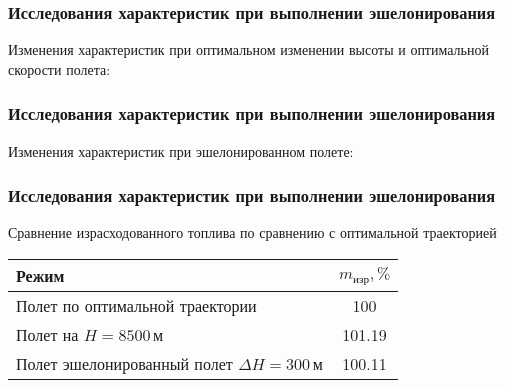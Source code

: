\documentclass{beamer}
\begin{document}
\begin{frame}[t]
    \frametitle{Исследования характеристик при выполнении эшелонирования}
    \begin{center}
        Изменения характеристик при оптимальном изменении высоты и оптимальной
        скорости полета:

        \begin{minipage}{0.49\textwidth}
            \centering
            \resizebox{1.0\textwidth}{!}{}
        \end{minipage}
        \hfill
        \begin{minipage}{0.49\textwidth}
            \centering
            \resizebox{1.0\textwidth}{!}{}
        \end{minipage}
    \end{center}
\end{frame}

\begin{frame}[t]
    \frametitle{Исследования характеристик при выполнении эшелонирования}
    \begin{center}
        Изменения характеристик при эшелонированном полете: 

        \begin{minipage}{0.49\textwidth}
            \centering
            \resizebox{1.0\textwidth}{!}{}
        \end{minipage}
        \hfill
        \begin{minipage}{0.49\textwidth}
            \centering
            \resizebox{1.0\textwidth}{!}{
            }
        \end{minipage}
    \end{center}
\end{frame}


\begin{frame}[t]
    \frametitle{Исследования характеристик при выполнении эшелонирования}
    \begin{center}

        Сравнение израсходованного топлива по сравнению с
        оптимальной траекторией    

        \begin{tabular}{|p{}|c|}
            \hline
            Режим & $m_{изр}, \%$ \\ 
            \hline
            Полет по оптимальной траектории & 100 \\ 
            \hline
            Полет на $H=8500\,м$ & 101.19 \\
            \hline
            Полет эшелонированный полет $\Delta H =300\, м$ & 100.11 \\
            \hline
        \end{tabular}
    \end{center}
\end{frame}
\end{document}
